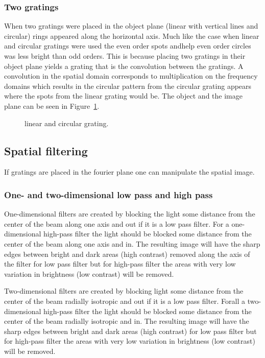 \documentclass[12pt,a4paper]{article}
\begin{document}
\subsubsection{Two gratings}
When two gratings were placed in the object plane (linear with vertical lines and circular) rings appeared along the horizontal axis. Much like the case when linear and circular gratings were used the even order spots andhelp even order circles was less bright than odd orders. This is because placing two gratings in their object plane yields a grating that is the convolution between the gratings. A convolution in the spatial domain corresponds to multiplication on the frequency domains which results in the circular pattern from the circular grating appears where the spots from the linear grating would be. The object and the image plane can be seen in Figure~\ref{fig:lin_circ_grating}.
\begin{figure}[h]
  \centering
  \noindent\makebox[\textwidth]{\scalebox{0.70}{}}
  \caption{linear and circular grating.}
  \label{fig:lin_circ_grating}
\end{figure}

\subsection{Spatial filtering}
If gratings are placed in the fourier plane one can manipulate the spatial image.

\subsubsection{One- and two-dimensional low pass and high pass}
One-dimensional filters are created by blocking the light some distance from the center of the beam along one axis and out if it is a low pass filter. For a one-dimensional high-pass filter the light should be blocked some distance from the center of the beam along one axis and in.
The resulting image will have the sharp edges between bright and dark areas (high contrast) removed along the axis of the filter for low pass filter but for high-pass filter the areas with very low variation in brightness (low contrast) will be removed.

Two-dimensional filters are created by blocking light some distance from the center of the beam radially isotropic and out if it is a low pass filter. Forall a two-dimensional high-pass filter the light should be blocked some distance from the center of the beam radially isotropic and in.
The resulting image will have the sharp edges between bright and dark areas (high contrast) for low pass filter but for high-pass filter the areas with very low variation in brightness (low contrast) will be removed.
\end{document}
